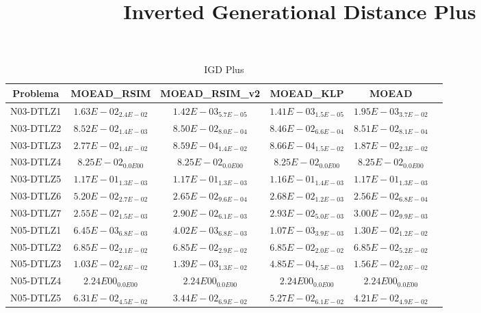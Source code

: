 \documentclass{article}
\title{Inverted Generational Distance Plus}
\author{}
\begin{document}
\maketitle
\begin{table*}[ht!]
\scriptsize
\caption{IGD Plus}
\centering\begin{tabular}{|c||c||c||c||c||c|} \hline
Problema &MOEAD_RSIM &MOEAD_RSIM_v2 &MOEAD_KLP &MOEAD\\\hline
N03-DTLZ1 &$1.63E-02_{2.4E-02}$ &\cellcolor{gray25}$1.42E-03_{5.7E-05}$ &\cellcolor{gray95}$1.41E-03_{1.5E-05}$ &$1.95E-03_{3.7E-02}$\\ 
\hline
N03-DTLZ2 &$8.52E-02_{1.4E-03}$ &\cellcolor{gray25}$8.50E-02_{8.0E-04}$ &\cellcolor{gray95}$8.46E-02_{6.6E-04}$ &$8.51E-02_{8.1E-04}$\\ 
\hline
N03-DTLZ3 &$2.77E-02_{1.4E-02}$ &\cellcolor{gray95}$8.59E-04_{1.4E-02}$ &\cellcolor{gray25}$8.66E-04_{1.5E-02}$ &$1.87E-02_{2.3E-02}$\\ 
\hline
N03-DTLZ4 &\cellcolor{gray95}$8.25E-02_{0.0E00}$ &\cellcolor{gray25}$8.25E-02_{0.0E00}$ &$8.25E-02_{0.0E00}$ &$8.25E-02_{0.0E00}$\\ 
\hline
N03-DTLZ5 &\cellcolor{gray25}$1.17E-01_{1.3E-03}$ &$1.17E-01_{1.3E-03}$ &\cellcolor{gray95}$1.16E-01_{1.4E-03}$ &$1.17E-01_{1.3E-03}$\\ 
\hline
N03-DTLZ6 &$5.20E-02_{2.7E-02}$ &\cellcolor{gray25}$2.65E-02_{9.6E-04}$ &$2.68E-02_{1.2E-03}$ &\cellcolor{gray95}$2.56E-02_{6.8E-04}$\\ 
\hline
N03-DTLZ7 &\cellcolor{gray95}$2.55E-02_{1.5E-03}$ &\cellcolor{gray25}$2.90E-02_{6.1E-03}$ &$2.93E-02_{5.0E-03}$ &$3.00E-02_{9.9E-03}$\\ 
\hline
N05-DTLZ1 &$6.45E-03_{6.8E-03}$ &\cellcolor{gray25}$4.02E-03_{6.8E-03}$ &\cellcolor{gray95}$1.07E-03_{3.9E-03}$ &$1.30E-02_{1.2E-02}$\\ 
\hline
N05-DTLZ2 &\cellcolor{gray25}$6.85E-02_{2.1E-02}$ &$6.85E-02_{2.9E-02}$ &\cellcolor{gray95}$6.85E-02_{2.0E-02}$ &$6.85E-02_{5.2E-02}$\\ 
\hline
N05-DTLZ3 &$1.03E-02_{2.6E-02}$ &\cellcolor{gray25}$1.39E-03_{1.3E-02}$ &\cellcolor{gray95}$4.85E-04_{7.5E-03}$ &$1.56E-02_{2.0E-02}$\\ 
\hline
N05-DTLZ4 &\cellcolor{gray95}$2.24E00_{0.0E00}$ &\cellcolor{gray25}$2.24E00_{0.0E00}$ &$2.24E00_{0.0E00}$ &$2.24E00_{0.0E00}$\\ 
\hline
N05-DTLZ5 &$6.31E-02_{4.5E-02}$ &\cellcolor{gray95}$3.44E-02_{6.9E-02}$ &$5.27E-02_{6.1E-02}$ &\cellcolor{gray25}$4.21E-02_{4.9E-02}$\\ 

\end{tabular}
\end{table*}
\end{document}
